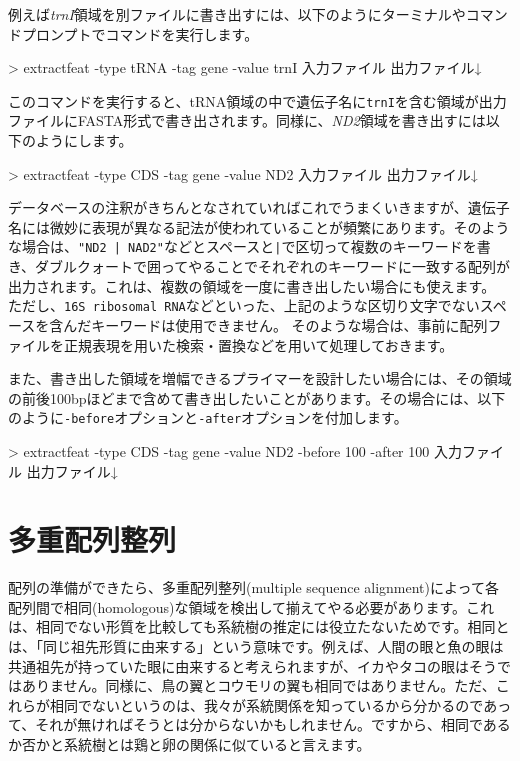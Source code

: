 \documentclass[titlepage,10pt,a4paper]{jsbook}
\newenvironment{cmd}{\begin{oframed}\raggedright\ttfamily\footnotesize\setlength{\baselineskip}{1.4em}}{\end{oframed}\vspace{-1em}}
\begin{document}
例えば\textit{trnI}領域を別ファイルに書き出すには、以下のようにターミナルやコマンドプロンプトでコマンドを実行します。
\begin{cmd}
{\textgreater} extractfeat -type tRNA -tag gene -value trnI 入力ファイル 出力ファイル↓
\end{cmd}
このコマンドを実行すると、tRNA領域の中で遺伝子名に\texttt{trnI}を含む領域が出力ファイルにFASTA形式で書き出されます。同様に、\textit{ND2}領域を書き出すには以下のようにします。
\begin{cmd}
{\textgreater} extractfeat -type CDS -tag gene -value ND2 入力ファイル 出力ファイル↓
\end{cmd}
データベースの注釈がきちんとなされていればこれでうまくいきますが、遺伝子名には微妙に表現が異なる記法が使われていることが頻繁にあります。そのような場合は、\texttt{"ND2 | NAD2"}などとスペースと\texttt{|}で区切って複数のキーワードを書き、ダブルクォートで囲ってやることでそれぞれのキーワードに一致する配列が出力されます。これは、複数の領域を一度に書き出したい場合にも使えます。
ただし、\texttt{16S ribosomal RNA}などといった、上記のような区切り文字でないスペースを含んだキーワードは使用できません。
そのような場合は、事前に配列ファイルを正規表現を用いた検索・置換などを用いて処理しておきます。

また、書き出した領域を増幅できるプライマーを設計したい場合には、その領域の前後100bpほどまで含めて書き出したいことがあります。その場合には、以下のように\texttt{-before}オプションと\texttt{-after}オプションを付加します。
\begin{cmd}
{\textgreater} extractfeat -type CDS -tag gene -value ND2 -before 100 -after 100 入力ファイル 出力ファイル↓
\end{cmd}

\section{多重配列整列}

配列の準備ができたら、多重配列整列(multiple sequence alignment)によって各配列間で相同(homologous)な領域を検出して揃えてやる必要があります。これは、相同でない形質を比較しても系統樹の推定には役立たないためです。相同とは、「同じ祖先形質に由来する」という意味です。例えば、人間の眼と魚の眼は共通祖先が持っていた眼に由来すると考えられますが、イカやタコの眼はそうではありません。同様に、鳥の翼とコウモリの翼も相同ではありません。ただ、これらが相同でないというのは、我々が系統関係を知っているから分かるのであって、それが無ければそうとは分からないかもしれません。ですから、相同であるか否かと系統樹とは鶏と卵の関係に似ていると言えます。
\end{document}
